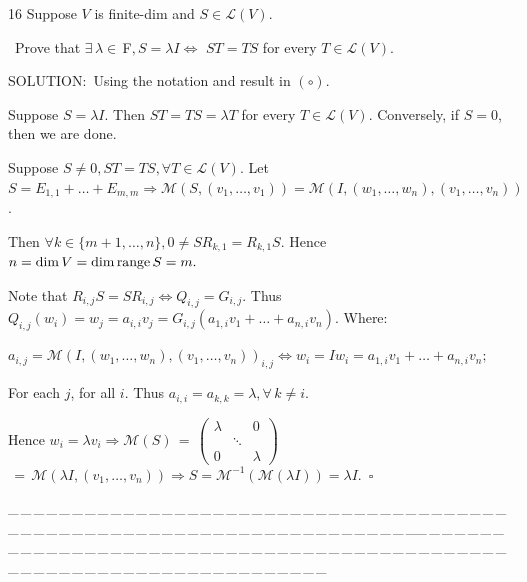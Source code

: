 \documentclass[a4paper, 11pt, UTF8]{article}
\def\range{\textup{range}\,}
\def\Lm{\mathcal{L}}
\def\Mt{\mathcal{M}}
\def\Fbfc{$\,{\timesbf F}$}
\begin{document}
\begin{large}
{\timesbf\Large 16} {\timessl\Large 
Suppose $V$ is finite-dim and $S\in\Lm(V)$.}\par\quad\,
{\timessl\Large Prove that $\exists\,\lambda\in\Fbfc,S=\lambda I\Longleftrightarrow$ $ST=TS$ for every $T\in\Lm(V)$.
}\par
{\timesbf S\footnotesize{OLUTION:}}\,\,\,Using the notation and result in $(\circ)$.\par\quad
Suppose $S=\lambda I$. Then $ST=TS=\lambda T$ for every $T\in\Lm(V).$ Conversely, if $S=0$, then we are done.\par\quad
Suppose $S\neq 0,ST=TS,\forall T\in\Lm(V).$ Let $S=E_{1,1}+\dots+E_{m,m}\Rightarrow \Mt(S,(v_1,\dots,v_1))=\Mt(I,(w_1,\dots,w_n),(v_1,\dots,v_n))$.\par\quad
Then $\forall k\in\{m+1,\dots,n\},0\neq SR_{k,1}=R_{k,1}S.$ Hence $n=\dim V=\dim\range S=m.$\par\quad
Note that $R_{i,j}S=SR_{i,j}\Longleftrightarrow Q_{i,j}=G_{i,j}$. Thus $Q_{i,j}(w_i)=w_j=a_{i,i}v_j=G_{i,j}(a_{1,i} v_1+\dots+a_{n,i} v_n).$ Where:\par\qquad
$a_{i,j}=\Mt(I,(w_1,\dots,w_n),(v_1,\dots,v_n))_{i,j}\Longleftrightarrow w_i=Iw_i=a_{1,i} v_1 +\dots+a_{n,i} v_n;$\par\qquad
For each $j$, for all $i.$ Thus $a_{i,i}=a_{k,k}=\lambda, \forall\, k\neq i.$\par\quad
Hence $w_i=\lambda v_i\Rightarrow\Mt(S)\,=\,${\small$\begin{pmatrix}
\lambda & & 0\\
& \ddots \\
0 & & \lambda
\end{pmatrix}$}$\,=\,\Mt(\lambda I,(v_1,\dots,v_n))\Rightarrow S=\Mt^{-1}(\Mt(\lambda I))=\lambda I.\,\,\,\square$\par
{\tiny \_\,\_\,\_\,\_\,\_\,\_\,\_\,\_\,\_\,\_\,\_\,\_\,\_\,\_\,\_\,\_\,\_\,\_\,\_\,\_\,\_\,\_\,\_\,\_\,\_\,\_\,\_\,\_\,\_\,\_\,\_\,\_\,\_\,\_\,\_\,\_\,\_\,\_\,\_\,\_\,\_\,\_\,\_\,\_\,\_\,\_\,\_\,\_\,\_\,\_\,\_\,\_\,\_\,\_\,\_\,\_\,\_\,\_\,\_\,\_\,\_\,\_\,\_\,\_\,\_\,\_\,\_\,\_\,\_\,\_\,\_\_\,\_\,\_\,\_\,\_\,\_\,\_\,\_\,\_\,\_\,\_\,\_\,\_\,\_\,\_\,\_\,\_\,\_\,\_\,\_\,\_\,\_\,\_\,\_\,\_\,\_\,\_\,\_\,\_\,\_\,\_\,\_\,\_\,\_\,\_\,\_\,\_\,\_\,\_\,\_\,\_\,\_\,\_\,\_\,\_\,\_\,\_\,\_\,\_\,\_\,\_\,\_\,\_\,\_\,\_\,\_\,\_\,\_\,\_\,\_\,\_\,\_\,\_\,\_\,\_\,\_\,\_\,\_\,\_\,\_\,\_}{\tiny\,\par}


\end{large}
\end{document}
